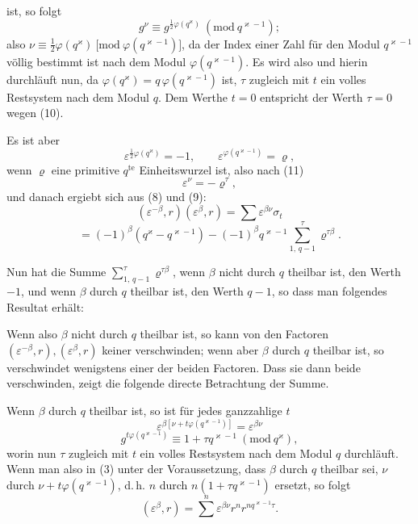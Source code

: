 ist, so folgt
\[
g^\nu \equiv g^{\frac{1}{2}\varphi(q^\varkappa)} \ (\mathrm{mod}\ q^{\varkappa-1});
\]
also $\nu \equiv \tfrac{1}{2}\varphi(q^\varkappa)\ \bigl[\mathrm{mod}\ \varphi(q^{\varkappa-1})\bigr]$, da der Index einer Zahl für den Modul $q^{\varkappa-1}$ völlig bestimmt ist nach dem Modul $\varphi(q^{\varkappa-1})$. Es wird also
und hierin durchläuft nun, da $\varphi(q^\varkappa) = q\,\varphi(q^{\varkappa-1})$ ist, $\tau$ zugleich mit $t$ ein volles Restsystem nach dem Modul $q$. Dem Werthe $t=0$ entspricht der Werth $\tau=0$ wegen (10).

Es ist aber
\[
\varepsilon^{\frac{1}{2}\varphi(q^\varkappa)} = -1, \qquad \varepsilon^{\varphi(q^{\varkappa-1})} = \varrho,
\]
wenn $\varrho$ eine primitive $q^{\text{te}}$ Einheitswurzel ist, also nach (11)
\[
\varepsilon^\nu = -\varrho^\tau,
\]
und danach ergiebt sich aus (8) und (9):
\[
(\varepsilon^{-\beta}, r)(\varepsilon^{\beta}, r) = \sum \varepsilon^{\beta\nu}\sigma_t
\]
\[
= (-1)^\beta (q^\varkappa - q^{\varkappa-1}) - (-1)^\beta q^{\varkappa-1} \sum_{1,\,q-1}^{\tau} \varrho^{\tau\beta}.
\]

Nun hat die Summe $\sum\limits_{1,\,q-1}^{\tau} \varrho^{\tau\beta}$, wenn $\beta$ nicht durch $q$ theilbar ist, den Werth $-1$, und wenn $\beta$ durch $q$ theilbar ist, den Werth $q-1$, so dass man folgendes Resultat erhält:

Wenn also $\beta$ nicht durch $q$ theilbar ist, so kann von den Factoren $(\varepsilon^{-\beta}, r), (\varepsilon^{\beta}, r)$ keiner verschwinden; wenn aber $\beta$ durch $q$ theilbar ist, so verschwindet wenigstens einer der beiden Factoren. Dass sie dann beide verschwinden, zeigt die folgende directe Betrachtung der Summe.

Wenn $\beta$ durch $q$ theilbar ist, so ist für jedes ganzzahlige $t$
\[
\varepsilon^{\beta[\nu + t\varphi(q^{\varkappa-1})]} = \varepsilon^{\beta\nu}
\]
\[
g^{t\varphi(q^{\varkappa-1})} \equiv 1 + \tau q^{\varkappa-1}\ (\mathrm{mod}\ q^\varkappa),
\]
worin nun $\tau$ zugleich mit $t$ ein volles Restsystem nach dem Modul $q$ durchläuft. Wenn man also in (3) unter der Voraussetzung, dass $\beta$ durch $q$ theilbar sei, $\nu$ durch $\nu + t\varphi(q^{\varkappa-1})$, d.\,h. $n$ durch $n(1+\tau q^{\varkappa-1})$ ersetzt, so folgt
\[
(\varepsilon^\beta, r) = \sum^{n} \varepsilon^{\beta\nu} r^n r^{n q^{\varkappa-1}\tau}.
\]
